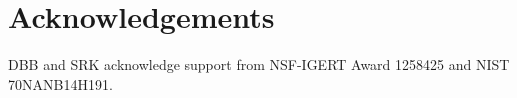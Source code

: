 \documentclass{bmcart}
\begin{document}




\section*{Acknowledgements}

DBB and SRK acknowledge support from NSF-IGERT Award 1258425 and NIST 70NANB14H191. 


\end{document}
